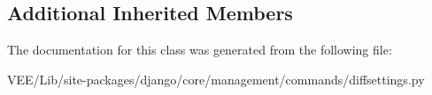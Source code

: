 \subsection*{Additional Inherited Members}


The documentation for this class was generated from the following file\+:\begin{DoxyCompactItemize}
\item 
V\+E\+E/\+Lib/site-\/packages/django/core/management/commands/diffsettings.\+py\end{DoxyCompactItemize}
